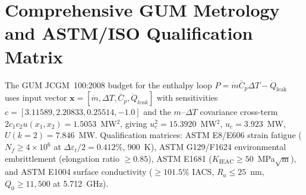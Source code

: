 \section{Comprehensive GUM Metrology and ASTM/ISO Qualification Matrix}
The GUM JCGM~100:2008 budget for the enthalpy loop
$P = \dot{m}\bar{C}_p\Delta T - \dot{Q}_{\text{leak}}$ uses input
vector $\mathbf{x} = [\dot{m}, \Delta T, \bar{C}_p, \dot{Q}_{leak}]$
with sensitivities $c = [3.11589, 2.20833, 0.25514, -1.0]$ and the
$m$--$\Delta T$ covariance cross-term $2c_1c_2u(x_1,x_2) =
1.5053$~MW$^2$, giving $u_c^2 = 15.3920$~MW$^2$,
$u_c = 3.923$~MW, $U(k{=}2) = 7.846$~MW.  Qualification matrices:
ASTM E8/E606 strain fatigue ($N_f \ge 4\times10^6$ at
$\Delta\varepsilon_t/2 = 0.412\%$, 900~K), ASTM G129/F1624
environmental embrittlement (elongation ratio $\ge 0.85$),
ASTM E1681 ($K_{\text{IEAC}} \ge 50$~MPa$\sqrt{\text{m}}$), and
ASTM E1004 surface conductivity ($\ge 101.5\%$ IACS,
$R_a \le 25$~nm, $Q_0 \ge 11{,}500$ at 5.712~GHz).
